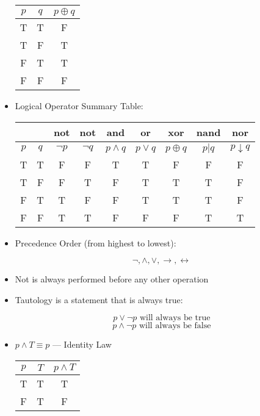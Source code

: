 \begin{itemize}
    \begin{center}
      \begin{tabular}[h]{|c|c|c|}
        \hline
        $p$ & $q$ & $p\oplus q$\\
        \hline
        T & T & F\\
        \hline
        T & F & T\\
        \hline
        F & T & T\\
        \hline
        F & F & F\\
        \hline
      \end{tabular}
    \end{center}

  \item Logical Operator Summary Table:

    \begin{center}
      \begin{tabular}[h]{|c|c|c|c|c|c|c|c|c|}
        \hline
        & & not & not & and & or & xor & nand & nor\\
        \hline
        $p$ & $q$ & $\neg p$ & $\neg q$ & $p\wedge q$ & $p\vee q$ & $p\oplus q$ & $p|q$ & $p\downarrow q$\\
        \hline
        T & T & F & F & T & T & F & F & F\\
        \hline
        T & F & F & T & F & T & T & T & F\\
        \hline
        F & T & T & F & F & T & T & T & F\\
        \hline
        F & F & T & T & F & F & F & T & T\\
        \hline
      \end{tabular}
    \end{center}

  \item Precedence Order (from highest to lowest):

    $$\neg,\wedge,\vee,\rightarrow,\leftrightarrow$$

  \item Not is always performed before any other operation

  \item Tautology is a statement that is always true:

    $$p\vee\neg p\text{ will always be true}$$
    $$p\wedge\neg p\text{ will always be false}$$

  \item $p\wedge T\equiv p$ — Identity Law

    \begin{center}
      \begin{tabular}[h]{|c|c|c|}
        \hline
        $p$ & $T$ & $p\wedge T$\\
        \hline
        T & T & T\\
        \hline
        F & T & F\\
        \hline
      \end{tabular}
    \end{center}


\end{itemize}

